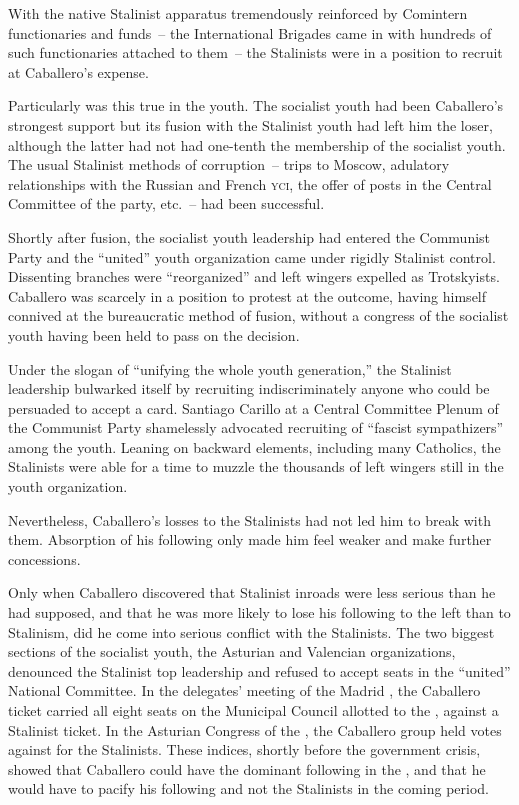 With the native Stalinist apparatus tremendously reinforced by Comintern functionaries and funds~-- the International Brigades came in with hundreds of such functionaries attached to them~-- the Stalinists were in a position to recruit at Caballero’s expense.

Particularly was this true in the youth. The socialist youth had been Caballero’s strongest support but its fusion with the Stalinist youth had left him the loser, although the latter had not had one-tenth the membership of the socialist youth. The usual Stalinist methods of corruption~-- trips to Moscow, adulatory relationships with the Russian and French \textsc{yci,} the offer of posts in the Central Committee of the party, etc.~-- had been successful.

Shortly after fusion, the socialist youth leadership had entered the Communist Party and the ``united'' youth organization came under rigidly Stalinist control. Dissenting branches were ``reorganized'' and left wingers expelled as Trotskyists. Caballero was scarcely in a position to protest at the outcome, having himself connived at the bureaucratic method of fusion, without a congress of the socialist youth having been held to pass on the decision.

Under the slogan of ``unifying the whole youth generation,'' the Stalinist leadership bulwarked itself by recruiting indiscriminately anyone who could be persuaded to accept a card. Santiago Carillo at a Central Committee Plenum of the Communist Party shamelessly advocated recruiting of ``fascist sympathizers'' among the youth. Leaning on backward elements, including many Catholics, the Stalinists were able for a time to muzzle the thousands of left wingers still in the youth organization.

Nevertheless, Caballero’s losses to the Stalinists had not led him to break with them. Absorption of his following only made him feel weaker and make further concessions.

Only when Caballero discovered that Stalinist inroads were less serious than he had supposed, and that he was more likely to lose his following to the left than to Stalinism, did he come into serious conflict with the Stalinists. The two biggest sections of the socialist youth, the Asturian and Valencian organizations, denounced the Stalinist top leadership and refused to accept seats in the ``united'' National Committee. In the delegates’ meeting of the Madrid \UGT\kn, the Caballero ticket carried all eight seats on the Municipal Council allotted to the \UGT\kn, against a Stalinist ticket. In the Asturian Congress of the \UGT\kn, the Caballero group held  votes against  for the Stalinists. These indices, shortly before the government crisis, showed that Caballero could have the dominant following in the \UGT\kn, and that he would have to pacify his following and not the Stalinists in the coming period.

